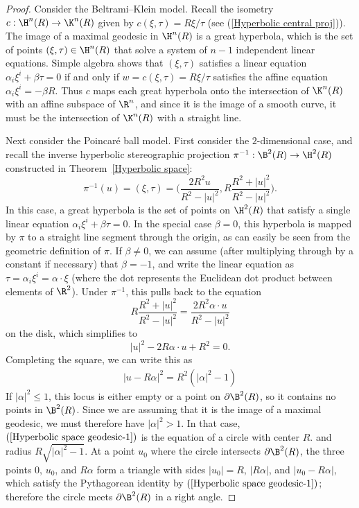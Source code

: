 \begin{proof}
Consider the Beltrami–Klein model. Recall the isometry $c:\H^n(R)\to\K^n(R)$ given by $c(\xi,\tau)=R\xi/\tau$ (see (\ref{Hyperbolic central proj})). The image of a maximal geodesic in $\H^n(R)$ is a great hyperbola, which is the set of points $(\xi,\tau)\in\H^n(R)$ that solve a system of $n-1$ independent linear equations. Simple algebra shows that $(\xi,\tau)$ satisfies a linear equation $\alpha_i\xi^i+\beta\tau=0$ if and only if $w=c(\xi,\tau)=R\xi/\tau$ satisfies the affine equation $\alpha_i\xi^i=-\beta R$. Thus $c$ maps each great hyperbola onto the intersection of $\K^n(R)$ with an affine subspace of $\R^n$, and since it is the image of a smooth curve, it must be the intersection of $\K^n(R)$ with a straight line.\par
Next consider the Poincar\'e ball model. First consider the $2$-dimensional case, and recall the inverse hyperbolic stereographic projection $\pi^{-1}:\B^2(R)\to\H^2(R)$ constructed in Theorem~\ref{Hyperbolic space}:
\[\pi^{-1}(u)=(\xi,\tau)=\Big(\frac{2R^2u}{R^2-|u|^2},R\frac{R^2+|u|^2}{R^2-|u|^2}\Big).\]
In this case, a great hyperbola is the set of points on $\H^2(R)$ that satisfy a single linear equation $\alpha_i\xi^i+\beta\tau=0$. In the special case $\beta=0$, this hyperbola is mapped by $\pi$ to a straight line segment through the origin, as can easily be seen from the geometric definition of $\pi$. If $\beta\neq 0$, we can assume (after multiplying through by a constant if necessary) that $\beta=-1$, and write the linear equation as $\tau=\alpha_i\xi^i=\alpha\cdot\xi$ (where the dot represents the Euclidean dot product between elements of $\R^2$). Under $\pi^{-1}$, this pulls back to the equation
\[R\frac{R^2+|u|^2}{R^2-|u|^2}=\frac{2R^2\alpha\cdot u}{R^2-|u|^2}\]
on the disk, which simplifies to
\[|u|^2-2R\alpha\cdot u+R^2=0.\]
Completing the square, we can write this as
\begin{align}\label{Hyperbolic space geodesic-1}
|u-R\alpha|^2=R^2(|\alpha|^2-1)
\end{align}
If $|\alpha|^2\leq 1$, this locus is either empty or a point on $\partial\B^2(R)$, so it contains no points in $\B^2(R)$. Since we are assuming that it is the image of a maximal geodesic, we must therefore have $|\alpha|^2>1$. In that case, $(\ref{Hyperbolic space geodesic-1})$ is the equation of a circle with center $R$. and radius $R\sqrt{|\alpha|^2-1}$. At a point $u_0$ where the circle intersects $\partial\B^2(R)$, the three points $0$, $u_0$, and $R\alpha$ form a triangle with sides $|u_0|=R$, $|R\alpha|$, and $|u_0-R\alpha|$, which satisfy the Pythagorean identity by $(\ref{Hyperbolic space geodesic-1})$; therefore the circle meets $\partial\B^2(R)$ in a right angle.\par

\end{proof}
